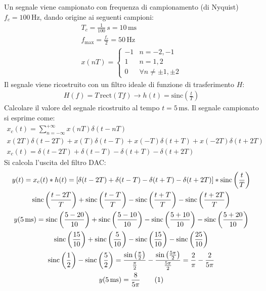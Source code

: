 \documentclass{article}
\newcommand{\rect}{\mathrm{rect}}
\newcommand{\sinc}{\mathrm{sinc}}
\newcommand{\tageq}{\tag{\stepcounter{equation}\theequation}}
\begin{document}
Un segnale viene campionato con frequenza di campionamento (di Nyquist) $f_c=100\,\mathrm{Hz}$, dando origine ai seguenti campioni:
\begin{gather*}
    T_c=\displaystyle\frac{1}{100}\,s=10\,\mathrm{ms}\\
    f_{\max}=\frac{f_c}{2}=50\,\mathrm{Hz}\\
    x(nT)=\begin{cases}
        -1&n=-2,-1\\
        1&n=1,2\\
        0&\forall n\neq\pm1,\pm2
    \end{cases}
\end{gather*}
Il segnale viene ricostruito con un filtro ideale di funzione di trasferimento $H$:
\begin{gather*}
    H(f)=T\,\rect(Tf)\to  h(t)=\sinc\left(\frac{t}{T}\right)
\end{gather*} 
Calcolare il valore del segnale ricostruito al tempo $t=5\,\mathrm{ms}$. Il segnale campionato si esprime come:
\begin{gather*}
    x_c(t)=\displaystyle\sum_{n=-\infty}^{+\infty}x(nT)\delta(t-nT)\\
    x(2T)\delta(t-2T)+x(T)\delta(t-T)+x(-T)\delta(t+T)+x(-2T)\delta(t+2T)\\
    x_c(t)=\delta(t-2T)+\delta(t-T)-\delta(t+T)-\delta(t+2T)
\end{gather*}
Si calcola l'uscita del filtro DAC:
\begin{gather*}
    y(t)=x_c(t)*h(t)=\left[\delta(t-2T)+\delta(t-T)-\delta(t+T)-\delta(t+2T)\right]*\sinc\left(\displaystyle\frac{t}{T}\right)\\
    \displaystyle\sinc\left(\frac{t-2T}{T}\right)+\sinc\left(\frac{t-T}{T}\right)-\sinc\left(\frac{t+T}{T}\right)-\sinc\left(\frac{t+2T}{T}\right)\\
    y(5\,\mathrm{ms})=\displaystyle\sinc\left(\frac{5-20}{10}\right)+\sinc\left(\frac{5-10}{10}\right)-\sinc\left(\frac{5+10}{10}\right)-\sinc\left(\frac{5+20}{10}\right)\\
    \displaystyle\sinc\left(\frac{15}{10}\right)+\sinc\left(\frac{5}{10}\right)-\sinc\left(\frac{15}{10}\right)-\sinc\left(\frac{25}{10}\right)\\
    \displaystyle\sinc\left(\frac{1}{2}\right)-\sinc\left(\frac{5}{2}\right)=\frac{\sin\left(\frac{\pi}{2}\right)}{\frac{\pi}{2}}-\frac{\sin\left(\frac{5\pi}{2}\right)}{\frac{5\pi}{2}}=\frac{2}{\pi}-\frac{2}{5\pi}\\
    y(5\,\mathrm{ms})=\displaystyle\frac{8}{5\pi}\tageq
\end{gather*}
\end{document}
